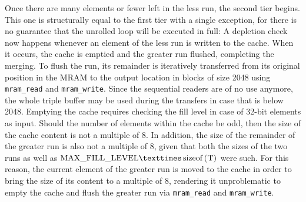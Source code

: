 Once there are \unrollfactor{} many elements or fewer left in the less run, the second tier begins.
This one is structurally equal to the first tier with a single exception, for there is no guarantee that the unrolled loop will be executed in full:
A depletion check now happens whenever an element of the less run is written to the cache.
When it occurs, the cache is emptied and the greater run flushed, completing the merging.
To flush the run, its remainder is iteratively transferred from its original position in the \ac{MRAM} to the output location in blocks of size \qty{2048}{\byte} using \lstinline|mram_read| and \lstinline|mram_write|.
Since the sequential readers are of no use anymore, the whole triple buffer may be used during the transfers in case that \cachesize{} is below 2048.
Emptying the cache requires checking the fill level in case of 32-bit elements as input.
Should the number of elements within the cache be odd, then the size of the cache content is not a multiple of 8.
In addition, the size of the remainder of the greater run is also not a multiple of 8, given that both the sizes of the two runs as well as \(\unrolledcachelength{} × \text{\lstinline[keywords={}]|sizeof(T)|}\) were such.
For this reason, the current element of the greater run is moved to the cache in order to bring the size of its content to a multiple of 8, rendering it unproblematic to empty the cache and flush the greater run via \lstinline|mram_read| and \lstinline|mram_write|.

\SetArgSty{}
\SetFuncArgSty{}




